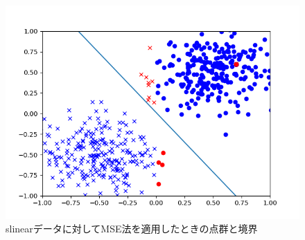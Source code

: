 \documentclass[class=jsarticle, crop=false, dvipdfmx, fleqn]{standalone}
\begin{document}
\begin{figure}
    \centering
    \includegraphics[clip, width=12cm]{../figures/assignment1_2_slinear_result}
    \caption{slinearデータに対してMSE法を適用したときの点群と境界}
    \label{fig:result2_slinear}
\end{figure}
\end{document}
